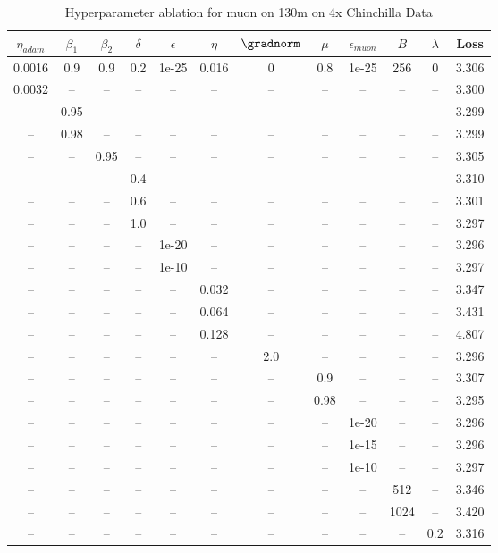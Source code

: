 \begin{table}[h!]
\centering
\caption{Hyperparameter ablation for muon on 130m on 4x Chinchilla Data}
\label{tab:ablation_muon_130m_on_4x_chinchilla_data}
\begin{tabular}{cccccccccccc}
\toprule
$\eta_{adam}$ & $\beta_1$ & $\beta_2$ & $\delta$ & $\epsilon$ & $\eta$ & $\gradnorm$ & $\mu$ & $\epsilon_{muon}$ & $B$ & $\lambda$ & Loss \\
\midrule
0.0016 & 0.9 & 0.9 & 0.2 & 1e-25 & 0.016 & 0 & 0.8 & 1e-25 & 256 & 0 & 3.306 \\
\midrule
0.0032 & -- & -- & -- & -- & -- & -- & -- & -- & -- & -- & 3.300 \\
-- & 0.95 & -- & -- & -- & -- & -- & -- & -- & -- & -- & 3.299 \\
-- & 0.98 & -- & -- & -- & -- & -- & -- & -- & -- & -- & 3.299 \\
-- & -- & 0.95 & -- & -- & -- & -- & -- & -- & -- & -- & 3.305 \\
-- & -- & -- & 0.4 & -- & -- & -- & -- & -- & -- & -- & 3.310 \\
-- & -- & -- & 0.6 & -- & -- & -- & -- & -- & -- & -- & 3.301 \\
-- & -- & -- & 1.0 & -- & -- & -- & -- & -- & -- & -- & 3.297 \\
-- & -- & -- & -- & 1e-20 & -- & -- & -- & -- & -- & -- & 3.296 \\
-- & -- & -- & -- & 1e-10 & -- & -- & -- & -- & -- & -- & 3.297 \\
-- & -- & -- & -- & -- & 0.032 & -- & -- & -- & -- & -- & 3.347 \\
-- & -- & -- & -- & -- & 0.064 & -- & -- & -- & -- & -- & 3.431 \\
-- & -- & -- & -- & -- & 0.128 & -- & -- & -- & -- & -- & 4.807 \\
-- & -- & -- & -- & -- & -- & 2.0 & -- & -- & -- & -- & 3.296 \\
-- & -- & -- & -- & -- & -- & -- & 0.9 & -- & -- & -- & 3.307 \\
-- & -- & -- & -- & -- & -- & -- & 0.98 & -- & -- & -- & 3.295 \\
-- & -- & -- & -- & -- & -- & -- & -- & 1e-20 & -- & -- & 3.296 \\
-- & -- & -- & -- & -- & -- & -- & -- & 1e-15 & -- & -- & 3.296 \\
-- & -- & -- & -- & -- & -- & -- & -- & 1e-10 & -- & -- & 3.297 \\
-- & -- & -- & -- & -- & -- & -- & -- & -- & 512 & -- & 3.346 \\
-- & -- & -- & -- & -- & -- & -- & -- & -- & 1024 & -- & 3.420 \\
-- & -- & -- & -- & -- & -- & -- & -- & -- & -- & 0.2 & 3.316 \\
\bottomrule
\end{tabular}
\end{table}

